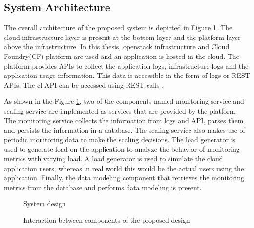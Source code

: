\documentclass[article,type=msc,colorback,12pt,accentcolor=tud8b,table]{tudthesis}
\begin{document}
\subsection{System Architecture} 

	The overall architecture of the proposed system is depicted in Figure \ref{fig:system_design}. The cloud infrastructure layer is present at the bottom layer and the platform layer above the infrastructure. In this thesis, openstack infrastructure and Cloud Foundry(CF) platform are used and an application is hosted in the cloud. The platform provides APIs to collect the application logs, infrastructure logs and the application usage information. This data is accessible in the form of logs or REST APIs. The \gls{cf} API can be accessed using REST calls \cite{cf_summary}. 
	
	As shown in the Figure \ref{fig:system_design}, two of the components named monitoring service and scaling service are implemented as services that are provided by the platform. The monitoring service collects the information from logs and API, parses them and persists the information in a database. The scaling service also makes use of periodic monitoring data to make the scaling decisions. The load generator is used to generate load on the application to analyze the behavior of monitoring metrics with varying load. A load generator is used to simulate the cloud application users, whereas in real world this would be the actual users using the application. Finally, the data modeling component that retrieves the monitoring metrics from the database and performs data modeling is present.

 			 \begin{figure}
 			 	\begin{center}
 			 	\end{center}
 			 	\caption{System design}
 			 	\label{fig:system_design}
 			 \end{figure}
 

 			 \begin{figure}
 			 	\begin{center}
 			 	\end{center}
 			 	\caption{Interaction between components of the proposed design}
 			 	\label{fig:system_component_interaction}
 			 \end{figure}
\end{document}
